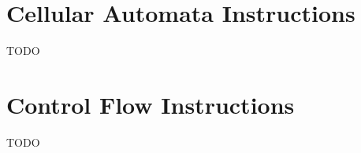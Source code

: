 \documentclass[a4paper]{article}
\begin{document}
\section{Cellular Automata Instructions}

TODO








\section{Control Flow Instructions}

TODO










\end{document}
